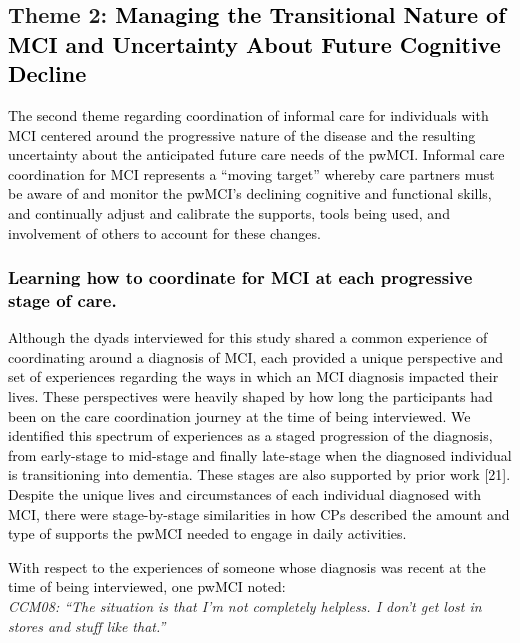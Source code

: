 \documentclass[acmsmall]{acmart}
\begin{document}
\subsection{Theme 2: \textcolor{black}{Managing the Transitional Nature of MCI and Uncertainty About Future Cognitive Decline}}

\textcolor{black}{The second theme regarding coordination of informal care for individuals with MCI centered around the progressive nature of the disease and the resulting uncertainty about the anticipated future care needs of the pwMCI. Informal care coordination for MCI represents a “moving target” whereby care partners must be aware of and monitor the pwMCI’s declining cognitive and functional skills, and continually adjust and calibrate the supports, tools being used, and involvement of others to account for these changes.}

\subsubsection{\textcolor{black}{Learning how to coordinate for MCI at each progressive stage of care.}}

\textcolor{black}{Although the dyads interviewed for this study shared a common experience of coordinating around a diagnosis of MCI, each provided a unique perspective and set of experiences regarding the ways \textcolor{black}{in which} an MCI diagnosis impacted their lives. These perspectives were heavily shaped by how long the participants had been on the care coordination journey at the time of being interviewed. We identified this spectrum of experiences as a staged progression of the diagnosis, from early-stage to mid-stage and finally late-stage when the diagnosed individual is transitioning into dementia. These stages are also supported by prior work [21]. Despite the unique lives and circumstances of each individual diagnosed with MCI, there were stage-by-stage similarities in how CPs described the amount and type of supports the pwMCI needed to engage in daily activities.}

\textcolor{black}{With respect to the experiences of someone whose diagnosis was recent at the time of being interviewed, one pwMCI noted:}
\\

\textit{CCM08: “The situation is that I'm not completely helpless. I don't get lost in stores and stuff like that.”}
\\
\end{document}
